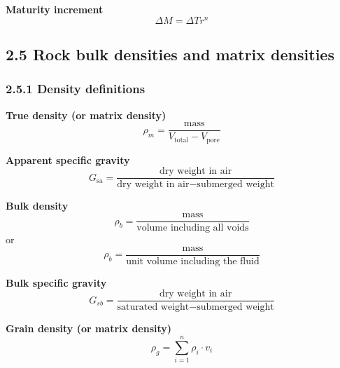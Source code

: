 \textbf{Maturity increment}
\begin{equation*}
    \Delta M = \Delta T r^n\tag{2.11}
\end{equation*}

\subsection{2.5 Rock bulk densities and matrix densities}
\subsubsection{2.5.1 Density definitions}
\textbf{True density (or matrix density)}
\begin{equation*}
    \rho_m = \frac{\mathrm{mass}}{V_\mathrm{total} - V_\mathrm{pore}}\tag{2.12}
\end{equation*}

\textbf{Apparent specific gravity}
\begin{equation*}
    G_\mathrm{sa} = \frac{\text{dry weight in air}}{\text{dry weight in air} - \text{submerged weight}}
\end{equation*}

\textbf{Bulk density}
\begin{equation*}
    \rho_b = \frac{\text{mass}}{\text{volume including all voids}}
\end{equation*}
or
\begin{equation*}
    \rho_b = \frac{\text{mass}}{\text{unit volume including the fluid}}
\end{equation*}

\textbf{Bulk specific gravity}
\begin{equation*}
    G_{sb} = \frac{\text{dry weight in air}}{\text{saturated weight} - \text{submerged weight}}
\end{equation*}

\textbf{Grain density (or matrix density)}
\begin{equation*}
    \rho_g = \sum_{i=1}^{n}\rho_i\cdot v_i\tag{2.13}
\end{equation*}

